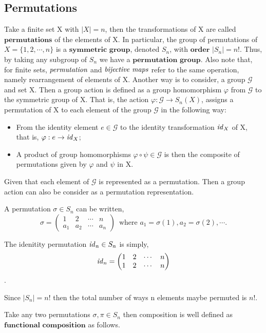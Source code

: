 \subsection{Permutations} %
\label{sec:permutations}
Take a finite set X with $|X|=n$, then the transformations of X are called $\textbf{permutations}$ of the
elements of X. In particular, the group of permutations of $X=\{ 1, 2, \cdots, n \}$ is a $\textbf{symmetric group}$,
denoted $S_n$, with $\textbf{order}$ $|S_n|=n!$. Thus, by taking any subgroup of $S_n$ we have a
$\textbf{permutation group}$. Also note that, for finite sets, $\emph{permutation}$ and $\emph{bijective maps}$
refer to the same operation, namely rearrangement of elements of X.
Another way is to consider, a group $\mathcal{G}$ and set X.
Then a group action is defined as a group homomorphism $\varphi$ from $\mathcal{G}$ to the symmetric group of X.
That is, the action $\varphi: \mathcal{G} \to S_n(X)$, assigns a permutation of X to each element of the group $\mathcal{G}$ in the following way:
\begin{itemize}
 \item From the identity element $e \in \mathcal{G}$ to the identity transformation $\mathit{id}_{X}$ of X, that is, $\varphi : e \to \mathit{id}_{X}$;
 \item A product of group homomorphisms $\varphi \circ \psi \in \mathcal{G}$ is then the composite of permutations given by $\varphi$ and $\psi$ in X.
\end{itemize}
Given that each element of $\mathcal{G}$ is represented as a permutation. Then a group action can also be consider as a permutation representation.

A permutation $\sigma \in S_n$ can be written,
\[
 \sigma =
 \begin{pmatrix}
  1 & 2 & \cdots & n \\
  a_1 & a_2 & \cdots & a_n
 \end{pmatrix}
 \, \, \,
 \text{where } a_1 = \sigma(1), a_2 = \sigma(2), \cdots .
\]

The idenitity permutation $\mathit{id}_{n} \in S_n$ is simply,
\[
 \mathit{id}_{n} =
 \begin{pmatrix}
  1 & 2 & \cdots & n \\
  1 & 2 & \cdots & n
 \end{pmatrix}
\].

Since $|S_n|=n!$ then the total number of ways n elements maybe permuted is $n!$.

Take any two permutations $\sigma,\pi \in S_n$ then composition is well defined as $\textbf{functional composition}$
as follows.

